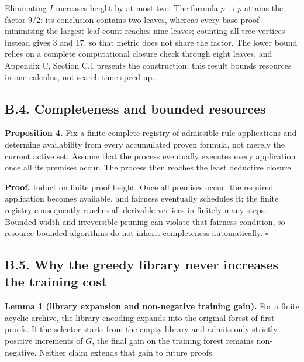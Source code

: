 \documentclass[pdflatex,sn-basic,Numbered]{sn-jnl}
\begin{document}
Eliminating \(I\) increases height by at most two. The formula \(p \rightarrow p\) attains the factor \(9/2\): its conclusion contains two leaves, whereas every base proof minimising the largest leaf count reaches nine leaves; counting all tree vertices instead gives 3 and 17, so that metric does not share the factor. The lower bound relies on a complete computational closure check through eight leaves, and Appendix C, Section C.1 presents the construction; this result bounds resources in one calculus, not search-time speed-up.

\subsection*{B.4. Completeness and bounded resources}\label{b.4.-completeness-and-bounded-resources}

\textbf{Proposition 4.} Fix a finite complete registry of admissible rule applications and determine availability from every accumulated proven formula, not merely the current active set. Assume that the process eventually executes every application once all its premises occur. The process then reaches the least deductive closure.

\textbf{Proof.} Induct on finite proof height. Once all premises occur, the required application becomes available, and fairness eventually schedules it; the finite registry consequently reaches all derivable vertices in finitely many steps. Bounded width and irreversible pruning can violate that fairness condition, so resource-bounded algorithms do not inherit completeness automatically. \(\square\)

\subsection*{B.5. Why the greedy library never increases the training cost}\label{b.5.-why-the-greedy-library-never-increases-the-training-cost}

\textbf{Lemma 1 (library expansion and non-negative training gain).} For a finite acyclic archive, the library encoding expands into the original forest of first proofs. If the selector starts from the empty library and admits only strictly positive increments of \(G\), the final gain on the training forest remains non-negative. Neither claim extends that gain to future proofs.
\end{document}
